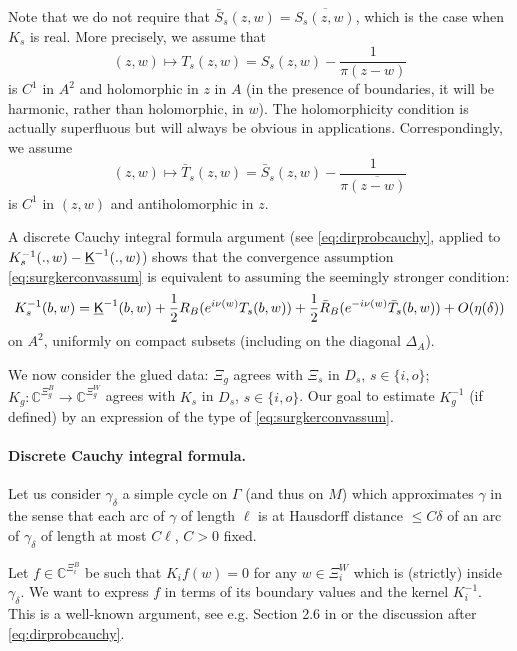 \documentclass[10pt]{article}
\newcommand{\C}{\mathbb{C}}
\newcommand{\uK}{{\underline {\sf K}}}
\begin{document}
Note that we do not require that $\bar S_s(z,w)=\overline{S_s(z,w)}$, which is the case when $K_s$ is real. More precisely, we assume that 
\begin{equation}\label{eq:surgregassum}
(z,w)\mapsto T_s(z,w)=S_s(z,w)-\frac{1}{\pi(z-w)}
\end{equation}
is $C^1$ in $A^2$ and holomorphic in $z$ in $A$ (in the presence of boundaries, it will be harmonic, rather than holomorphic, in $w$). The holomorphicity condition is actually superfluous but will always be obvious in applications. Correspondingly, we assume
$$(z,w)\mapsto \bar T_s(z,w)=\bar S_s(z,w)-\frac{1}{\pi\overline{(z-w)}}$$ 
is $C^1$ in $(z,w)$ and antiholomorphic in $z$.

A discrete Cauchy integral formula argument (see \eqref{eq:dirprobcauchy}, applied to $K_s^{-1}(.,w)-\uK^{-1}(.,w)$) shows that the convergence assumption \eqref{eq:surgkerconvassum} is equivalent to assuming the seemingly stronger condition:
$$K_s^{-1}(b,w)=\uK^{-1}(b,w)+\frac 12 R_B(e^{i\nu(w)}T_s(b,w))+
\frac 12\bar R_B(e^{-i\nu(w)}\bar T_s(b,w))+O(\eta(\delta))$$
on $A^2$, uniformly on compact subsets (including on the diagonal $\Delta_A$).

We now consider the glued data: $\Xi_g$ agrees with $\Xi_s$ in $D_s$, $s\in\{i,o\}$; $K_g: \C^{\Xi_g^B}\rightarrow\C^{\Xi^W_g}$ agrees with $K_s$ in $D_s$, $s\in\{i,o\}$.  Our goal to estimate $K_g^{-1}$ (if defined) by an expression of the type of \eqref{eq:surgkerconvassum}.


\paragraph{Discrete Cauchy integral formula.}

Let us consider $\gamma_\delta$ a simple cycle on $\Gamma$ (and thus on $M$) which approximates $\gamma$ in the sense that each arc of $\gamma$ of length $\ell$ is at Hausdorff distance $\leq C\delta$ of an arc of $\gamma_\delta$ of length at most $C\ell$, $C>0$ fixed.

Let $f\in\C^{\Xi_i^B}$ be such that $K_if(w)=0$ for any $w\in\Xi_i^W$ which is (strictly) inside $\gamma_\delta$. We want to express $f$ in terms of its boundary values and the kernel $K_i^{-1}$. This is a well-known argument, see e.g. Section 2.6 in \cite{SmiChe_isoradial} or the discussion after \eqref{eq:dirprobcauchy}.
\end{document}
